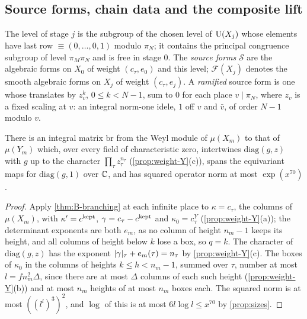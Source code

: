 \subsection{Source forms, chain data and the composite lift}\label{ss:composite-lift}
The level of stage $j$ is the subgroup of the chosen level of $\operatorname{U}(X_j)$ whose elements have last row
$\equiv(0,\dots,0,1)$ modulo $\pi_N$; it contains the principal congruence subgroup of level $\pi_M\pi_N$ and is free
in stage $0$. The \emph{source forms} $\mathcal S$ are the algebraic forms on $X_0$ of weight $(c_\tau,e_0)$ and this
level; $\mathcal F(X_j)$ denotes the smooth algebraic forms on $X_j$ of weight $(c_\tau,e_j)$. A \emph{ramified} source
form is one whose translates by $z_v^k$, $0\le k<N-1$, sum to $0$ for each place $v\mid\pi_N$, where $z_v$ is a fixed
scaling at $v$: an integral norm-one idele, $1$ off $v$ and $\bar v$, of order $N-1$ modulo $v$.

\begin{proposition}\label{prop:branching}
There is an integral matrix $\mathrm{br}$ from the Weyl module of $\mu(X_m)$ to that of $\mu(Y_m)$ which, over every
field of characteristic zero, intertwines $\mathrm{diag}(g,z)$ with $g$ up to the character
$\prod_\tau z_\tau^{n_\tau}$ (\cref{prop:weight-Y}(c)), spans the equivariant maps for $\mathrm{diag}(g,1)$ over $\mathbb{C}$,
and has squared operator norm at most $\exp(x^{70})$.
\end{proposition}

\begin{proof}
Apply \cref{thm:B-branching} at each infinite place to $\kappa=c_\tau$, the columns of $\mu(X_m)$, with $\kappa'=c^{\rm kept}$, $\gamma=c_\tau-c^{\rm kept}$ and $\kappa_0=c^Y_\tau$ (\cref{prop:weight-Y}(a)); the determinant exponents are both $e_m$, as no column of height $n_m-1$ keeps its height, and all columns of height below $k$ lose a box, so $q=k$.
The character of $\mathrm{diag}(g,z)$ has the exponent $\lvert \gamma\rvert_\tau+e_m(\tau)=n_\tau$ by \cref{prop:weight-Y}(c). The boxes of $\kappa_0$ in the columns of heights $k\le h<n_m-1$, summed over $\tau$, number at most $l=fn_m^2\Delta$, since there are at most $\Delta$ columns of each such height (\cref{prop:weight-Y}(b)) and at most
$n_m$ heights of at most $n_m$ boxes each. The squared norm is at most $((l^l)^3)^2$, and $\log$ of this is at most $6l\log l\le x^{70}$ by \cref{prop:sizes}.
\end{proof}

